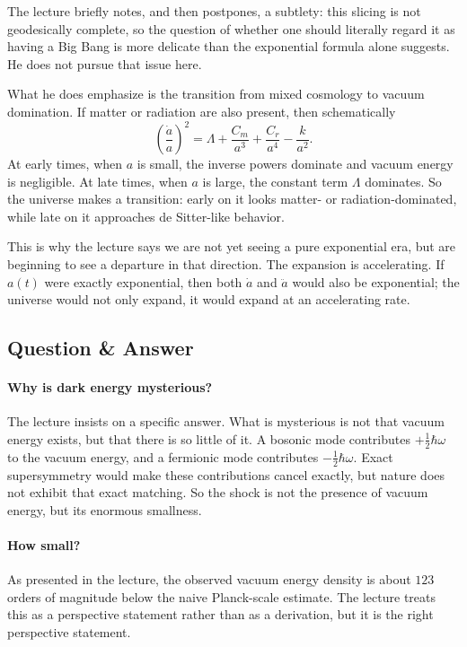 The lecture briefly notes, and then postpones, a subtlety: this slicing is not geodesically complete, so the question of whether one should literally regard it as having a Big Bang is more delicate than the exponential formula alone suggests. He does not pursue that issue here.

What he does emphasize is the transition from mixed cosmology to vacuum domination. If matter or radiation are also present, then schematically
\begin{equation}
\left(\frac{\dot a}{a}\right)^2
=
\Lambda+\frac{C_m}{a^3}+\frac{C_r}{a^4}-\frac{k}{a^2}.
\end{equation}
At early times, when \(a\) is small, the inverse powers dominate and vacuum energy is negligible. At late times, when \(a\) is large, the constant term \(\Lambda\) dominates. So the universe makes a transition: early on it looks matter- or radiation-dominated, while late on it approaches de Sitter-like behavior.

This is why the lecture says we are not yet seeing a pure exponential era, but are beginning to see a departure in that direction. The expansion is accelerating. If \(a(t)\) were exactly exponential, then both \(\dot a\) and \(\ddot a\) would also be exponential; the universe would not only expand, it would expand at an accelerating rate.

\subsection{Question \& Answer}

\paragraph{Why is dark energy mysterious?} The lecture insists on a specific answer. What is mysterious is not that vacuum energy exists, but that there is so little of it. A bosonic mode contributes \(+\tfrac12\hbar\omega\) to the vacuum energy, and a fermionic mode contributes \(-\tfrac12\hbar\omega\). Exact supersymmetry would make these contributions cancel exactly, but nature does not exhibit that exact matching. So the shock is not the presence of vacuum energy, but its enormous smallness.

\paragraph{How small?} As presented in the lecture, the observed vacuum energy density is about \(123\) orders of magnitude below the naive Planck-scale estimate. The lecture treats this as a perspective statement rather than as a derivation, but it is the right perspective statement.

